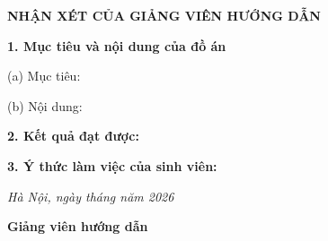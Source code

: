 \clearpage 
\pagestyle{empty} 

\begin{tcolorbox}[
    enhanced,
    colback=white,
    colframe=black,
    boxrule=0.6pt,
    sharp corners,
    width=\paperwidth,
    height=\paperheight,
    valign=top,
    left=25mm,
    right=25mm,
    top=20mm,
    bottom=20mm
]
\centering 
{\Large\bfseries NHẬN XÉT CỦA GIẢNG VIÊN HƯỚNG DẪN\par} 
\vspace{1cm} 

\begin{flushleft} 
\large 
\textbf{1. Mục tiêu và nội dung của đồ án} 

\vspace{0.4cm} 
(a) Mục tiêu: 
\par\dotfill 
\par\dotfill 
\par\dotfill 

\vspace{0.6cm} 
(b) Nội dung: 
\par\dotfill 
\par\dotfill 
\par\dotfill 
\par\dotfill 

\vspace{0.8cm} 
\textbf{2. Kết quả đạt được:} 
\par\dotfill 
\par\dotfill 
\par\dotfill 
\par\dotfill 

\vspace{0.8cm} 
\textbf{3. Ý thức làm việc của sinh viên:} 
\par\dotfill 
\par\dotfill 
\par\dotfill 
\par\dotfill 

\end{flushleft} 

\vfill 

\begin{flushright} 
\textit{Hà Nội, ngày \hspace{1cm} tháng \hspace{1cm} năm 2026} 

\textbf{Giảng viên hướng dẫn} 
\vspace{1.5cm} 
\end{flushright} 
\end{tcolorbox}
\restoregeometry
